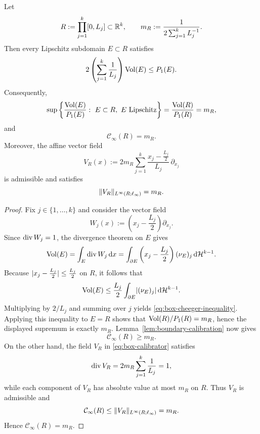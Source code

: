 \begin{lemma}
\label{lem:box-self-cheeger}
Let
\[
R:=\prod_{j=1}^k [0,L_j]\subset\mathbb{R}^k,
\qquad
m_R:=\frac{1}{2\sum_{j=1}^k L_j^{-1}}.
\]
Then every Lipschitz subdomain $E\subset R$ satisfies
\begin{equation}
\label{eq:box-cheeger-inequality}
2\left(\sum_{j=1}^k \frac{1}{L_j}\right)\operatorname{Vol}(E)\le P_1(E).
\end{equation}
Consequently,
\[
\sup\left\{
\frac{\operatorname{Vol}(E)}{P_1(E)}:\ E\subset R,\ E\text{ Lipschitz}
\right\}
=
\frac{\operatorname{Vol}(R)}{P_1(R)}
=
m_R,
\]
and
\[
\mathcal C_\infty(R)=m_R.
\]
Moreover, the affine vector field
\begin{equation}
\label{eq:box-calibrator}
V_R(x):=
2m_R\sum_{j=1}^k \frac{x_j-\frac{L_j}{2}}{L_j}\,\partial_{x_j}
\end{equation}
is admissible and satisfies
\[
\lVert V_R \rVert_{L^\infty(R;\ell_\infty)}=m_R.
\]
\end{lemma}

\begin{proof}
Fix $j\in\{1,\dots,k\}$ and consider the vector field
\[
W_j(x):=\left(x_j-\frac{L_j}{2}\right)\partial_{x_j}.
\]
Since $\operatorname{div} W_j=1$, the divergence theorem on $E$ gives
\[
\operatorname{Vol}(E)
=
\int_E \operatorname{div} W_j\,\mathrm{d} x
=
\int_{\partial E}\left(x_j-\frac{L_j}{2}\right)(\nu_E)_j\,\mathrm{d}\mathcal{H}^{k-1}.
\]
Because $\lvert x_j-\frac{L_j}{2} \rvert\le \frac{L_j}{2}$ on $R$, it follows that
\[
\operatorname{Vol}(E)\le \frac{L_j}{2}\int_{\partial E}\lvert (\nu_E)_j \rvert\,\mathrm{d}\mathcal{H}^{k-1}.
\]
Multiplying by $2/L_j$ and summing over $j$ yields
\eqref{eq:box-cheeger-inequality}. Applying this inequality to $E=R$ shows
that $\operatorname{Vol}(R)/P_1(R)=m_R$, hence the displayed supremum is exactly $m_R$.
Lemma~\ref{lem:boundary-calibration} now gives
\[
\mathcal C_\infty(R)\ge m_R.
\]
On the other hand, the field $V_R$ in \eqref{eq:box-calibrator} satisfies
\[
\operatorname{div} V_R
=
2m_R\sum_{j=1}^k \frac{1}{L_j}
=
1,
\]
while each component of $V_R$ has absolute value at most $m_R$ on $R$. Thus
$V_R$ is admissible and
\[
\mathcal C_\infty(R)\le
\lVert V_R \rVert_{L^\infty(R;\ell_\infty)}
=
m_R.
\]
Hence $\mathcal C_\infty(R)=m_R$.
\end{proof}

